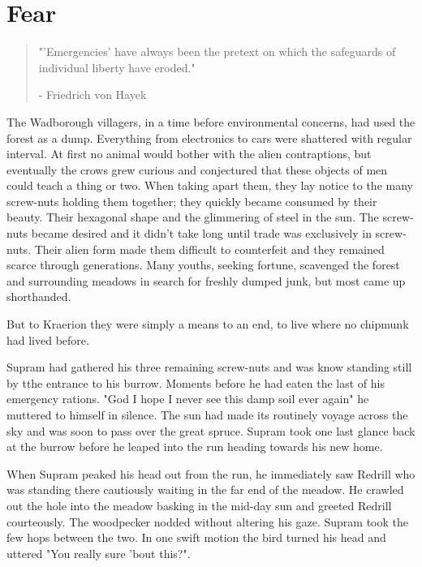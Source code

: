 \documentclass[smalldemyvopaper,11pt,twoside,onecolumn,openright,extrafontsizes]{memoir}
\begin{document}
\chapter{Fear}

\vspace{-1.3cm}
\begin{localsize}{10}
	\begin{quote}
		"'Emergencies' have always been the pretext on which the safeguards of individual liberty have eroded."
		\begin{flushright}- Friedrich von Hayek\end{flushright}
	\end{quote} 
\end{localsize}
\vspace{1cm}

The Wadborough villagers, in a time before environmental concerns, had used the forest as a dump. Everything from electronics to cars were shattered with regular interval. At first no animal would bother with the alien contraptions, but eventually the crows grew curious and conjectured that these objects of men could teach a thing or two. When taking apart them, they lay notice to the many screw-nuts holding them together; they quickly became consumed by their beauty. Their hexagonal shape and the glimmering of steel in the sun. The screw-nuts became desired and it didn't take long until trade was exclusively in screw-nuts. Their alien form made them difficult to counterfeit and they remained scarce through generations. Many youths, seeking fortune, scavenged the forest and surrounding meadows in search for freshly dumped junk, but most came up shorthanded. 

But to Kraerion they were simply a means to an end, to live where no chipmunk had lived before. 

Supram had gathered his three remaining screw-nuts and was know standing still by tthe entrance to his burrow. Moments before he had eaten the last of his 
emergency rations. "God I hope I never see this damp soil ever again" he muttered to himself in silence. The sun had made its routinely voyage across the sky and was soon to pass over the great spruce. Supram took one last glance back at the burrow before he leaped into the run heading towards his new home. 

When Supram peaked his head out from the run, he immediately saw Redrill who was standing there cautiously waiting in the far end of the meadow. He crawled out the hole into the meadow basking in the mid-day sun and greeted Redrill courteously. The woodpecker nodded without altering his gaze. Supram took the few hops between the two. In one swift motion the bird turned his head and uttered "You really sure 'bout this?".\\
\end{document}
